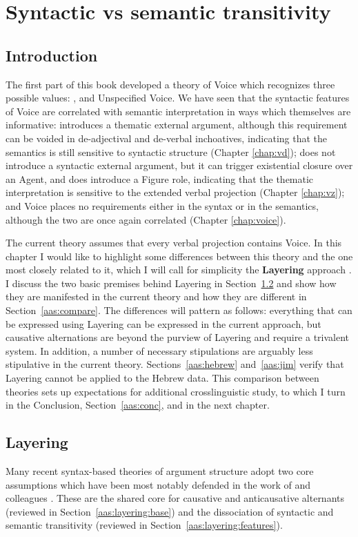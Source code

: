 \chapter{Syntactic vs semantic transitivity}
\label{chap:aas}

\section{Introduction} \label{sec:intro}
The first part of this book developed a theory of Voice which recognizes three possible values: {\vd}, {\vz} and Unspecified Voice. We have seen that the syntactic features of Voice are correlated with semantic interpretation in ways which themselves are informative: {\vd} introduces a thematic external argument, although this requirement can be voided in de-adjectival and de-verbal inchoatives, indicating that the semantics is still sensitive to syntactic structure (Chapter \ref{chap:vd}); {\vz} does not introduce a syntactic external argument, but it can trigger existential closure over an Agent, and {\pz} does introduce a Figure role, indicating that the thematic interpretation is sensitive to the extended verbal projection (Chapter \ref{chap:vz}); and Voice places no requirements either in the syntax or in the semantics, although the two are once again correlated (Chapter \ref{chap:voice}).

The current theory assumes that every verbal projection contains Voice. In this chapter I would like to highlight some differences between this theory and the one most closely related to it, which I will call for simplicity the \textbf{Layering} approach \citep{schaefer08,layering15}. I discuss the two basic premises behind Layering in Section~\ref{aas:layering} and show how they are manifested in the current theory and how they are different in Section~\ref{aas:compare}. The differences will pattern as follows: everything that can be expressed using Layering can be expressed in the current approach, but causative alternations are beyond the purview of Layering and require a trivalent system. In addition, a number of necessary stipulations are arguably less stipulative in the current theory. Sections~\ref{aas:hebrew} and~\ref{aas:jim} verify that Layering cannot be applied to the Hebrew data. This comparison between theories sets up expectations for additional crosslinguistic study, to which I turn in the Conclusion, Section~\ref{aas:conc}, and in the next chapter.


\section{Layering} \label{aas:layering}
Many recent syntax-based theories of argument structure adopt two core assumptions which have been most notably defended in the work of \cite{schaefer08} and colleagues \citep{alexiadouetal06,layering15}. These are the shared core for causative and anticausative alternants (reviewed in Section~\ref{aas:layering:base}) and the dissociation of syntactic and semantic transitivity (reviewed in Section~\ref{aas:layering:features}).

